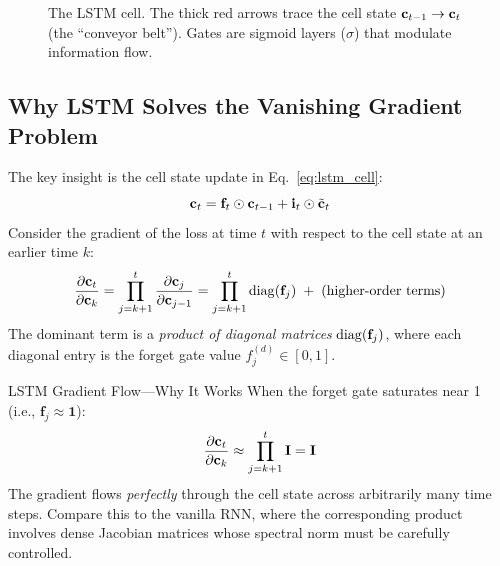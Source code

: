 \begin{figure}[H]
\caption{The LSTM cell.  The thick red arrows trace the cell state
$\mathbf{c}_{t-1} \to \mathbf{c}_t$ (the ``conveyor belt'').  Gates are sigmoid layers
($\sigma$) that modulate information flow.}
\label{fig:lstm_cell}
\end{figure}

\subsection{Why LSTM Solves the Vanishing Gradient Problem}

The key insight is the cell state update in Eq.~\eqref{eq:lstm_cell}:
\begin{equation}
\mathbf{c}_t = \mathbf{f}_t \odot \mathbf{c}_{t-1} + \mathbf{i}_t \odot \tilde{\mathbf{c}}_t
\end{equation}
Consider the gradient of the loss at time $t$ with respect to the cell state
at an earlier time $k$:
\begin{equation}
\frac{\partial \mathbf{c}_t}{\partial \mathbf{c}_k}
= \prod_{j=k+1}^{t} \frac{\partial \mathbf{c}_j}{\partial \mathbf{c}_{j-1}}
= \prod_{j=k+1}^{t} \operatorname{diag}(\mathbf{f}_j)
  \;+\; \text{(higher-order terms)}
\label{eq:lstm_gradient}
\end{equation}
The dominant term is a \emph{product of diagonal matrices}
$\operatorname{diag}(\mathbf{f}_j)$, where each diagonal entry is the forget gate value
$f_j^{(d)} \in [0, 1]$.

\begin{mathresult}{LSTM Gradient Flow---Why It Works}
When the forget gate saturates near 1 (i.e., $\mathbf{f}_j \approx \mathbf{1}$):
\begin{equation}
\frac{\partial \mathbf{c}_t}{\partial \mathbf{c}_k}
\approx \prod_{j=k+1}^{t} \mathbf{I} = \mathbf{I}
\end{equation}
The gradient flows \emph{perfectly} through the cell state across
arbitrarily many time steps.  Compare this to the vanilla RNN, where the
corresponding product involves dense Jacobian matrices whose spectral
norm must be carefully controlled.
\end{mathresult}

